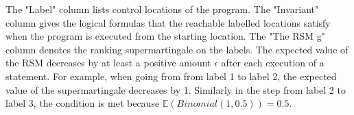 \documentclass[sigconf,review, anonymous]{acmart}
\begin{document}
The "Label" column lists control locations of the program. The "Invariant" column gives the logical formulas that the reachable labelled locations  satisfy when the program is executed from the starting location. The "The RSM g" column denotes the ranking supermartingale on the labels. The expected value of the RSM decreases by at least a positive amount $\epsilon$ after each execution of a statement. For example, 
when going from  from label 1 to label 2, the expected value of the supermartingale decreases by 1. Similarly  in the step from label 2 to label 3,  the condition is met because $\mathbb{E}(Binomial(1,0.5))=0.5$.
\end{document}
